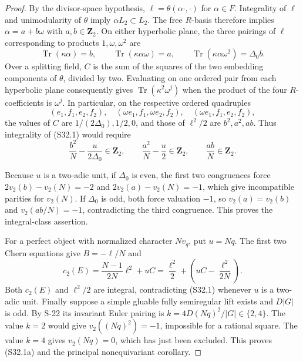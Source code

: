 \documentclass[11pt,a4paper]{article}
\theoremstyle{definition}
\begin{document}
\begin{proof}
By the divisor-space hypothesis, $\ell=\theta(\alpha\cdot,\cdot)$
for $\alpha\in F$. Integrality of $\ell$ and unimodularity
of $\theta$ imply $\alpha L_2\subset L_2$.
The free $R$-basis therefore implies
$\alpha=a+b\omega$ with $a,b\in\mathbf Z_2$.
On either hyperbolic plane, the three pairings of $\ell$
corresponding to products $1,\omega,\omega^2$ are
\[
 \operatorname{Tr}(\kappa\alpha)=b,\qquad
 \operatorname{Tr}(\kappa\alpha\omega)=a,\qquad
 \operatorname{Tr}(\kappa\alpha\omega^2)=\Delta_0b.
 \tag{S32.3}
\]
Over a splitting field, $C$ is the sum of the squares
of the two embedding components of $\theta$, divided
by two. Evaluating on one ordered pair from each
hyperbolic plane consequently gives
$\operatorname{Tr}(\kappa^2\omega^j)$ when the product
of the four $R$-coefficients is $\omega^j$.
In particular, on the respective ordered quadruples
\[
 (e_1,f_1,e_2,f_2),\quad
 (\omega e_1,f_1,\omega e_2,f_2),\quad
 (\omega e_1,f_1,e_2,f_2),
\]
the values of $C$ are $1/(2\Delta_0),1/2,0$,
and those of $\ell^2/2$ are $b^2,a^2,ab$.
Thus integrality of (S32.1) would require
\[
 \frac{b^2}{N}-\frac{u}{2\Delta_0}\in\mathbf Z_2,
 \qquad
 \frac{a^2}{N}-\frac{u}{2}\in\mathbf Z_2,
 \qquad
 \frac{ab}{N}\in\mathbf Z_2.
 \tag{S32.4}
\]

Because $u$ is a two-adic unit, if $\Delta_0$ is even,
the first two congruences force
$2v_2(b)-v_2(N)=-2$ and
$2v_2(a)-v_2(N)=-1$, which give incompatible parities
for $v_2(N)$. If $\Delta_0$ is odd, both force valuation
$-1$, so $v_2(a)=v_2(b)$ and
$v_2(ab/N)=-1$, contradicting the third congruence.
This proves the integral-class assertion.

For a perfect object with normalized character
$Nv_q$, put $u=Nq$. The first two Chern equations give
$B=-\ell/N$ and
\[
 c_2(E)=\frac{N-1}{2N}\ell^2+uC
       =\frac{\ell^2}{2}
          +\left(uC-\frac{\ell^2}{2N}\right).
\]
Both $c_2(E)$ and $\ell^2/2$ are integral, contradicting
(S32.1) whenever $u$ is a two-adic unit.
Finally suppose a simple gluable fully semiregular lift
exists and $D|G|$ is odd. By S-22 its invariant Euler
pairing is
$k=4D(Nq)^2/|G|\in\{2,4\}$.
The value $k=2$ would give
$v_2((Nq)^2)=-1$, impossible for a rational square.
The value $k=4$ gives $v_2(Nq)=0$, which has just been
excluded. This proves (S32.1a) and the principal
nonequivariant corollary.
\end{proof}
\end{document}
